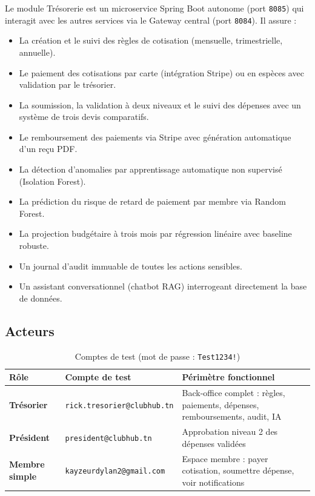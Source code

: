 \documentclass[11pt,a4paper]{article}
\begin{document}
Le module Trésorerie est un microservice Spring Boot autonome (port \texttt{8085}) qui interagit avec les autres services via le Gateway central (port \texttt{8084}). Il assure :

\begin{itemize}[leftmargin=*]
  \item La création et le suivi des règles de cotisation (mensuelle, trimestrielle, annuelle).
  \item Le paiement des cotisations par carte (intégration Stripe) ou en espèces avec validation par le trésorier.
  \item La soumission, la validation à deux niveaux et le suivi des dépenses avec un système de trois devis comparatifs.
  \item Le remboursement des paiements via Stripe avec génération automatique d'un reçu PDF.
  \item La détection d'anomalies par apprentissage automatique non supervisé (Isolation Forest).
  \item La prédiction du risque de retard de paiement par membre via Random Forest.
  \item La projection budgétaire à trois mois par régression linéaire avec baseline robuste.
  \item Un journal d'audit immuable de toutes les actions sensibles.
  \item Un assistant conversationnel (chatbot RAG) interrogeant directement la base de données.
\end{itemize}

\subsection{Acteurs}

\begin{table}[h]
  \centering
  \small
  \begin{tabularx}{\linewidth}{>{\bfseries}llX}
    \toprule
    Rôle & Compte de test & Périmètre fonctionnel \\
    \midrule
    Trésorier         & \texttt{rick.tresorier@clubhub.tn}  & Back-office complet : règles, paiements, dépenses, remboursements, audit, IA \\
    Président         & \texttt{president@clubhub.tn}       & Approbation niveau 2 des dépenses validées \\
    Membre simple     & \texttt{kayzeurdylan2@gmail.com}    & Espace membre : payer cotisation, soumettre dépense, voir notifications \\
    \bottomrule
  \end{tabularx}
  \caption{Comptes de test (mot de passe : \texttt{Test1234!})}
\end{table}
\end{document}
